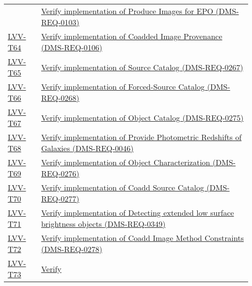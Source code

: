 \begin{longtable}[]{@{}ll@{}}
&
\href{https://jira.lsstcorp.org/secure/Tests.jspa\#/testCase/LVV-T63}{Verify
implementation of Produce Images for EPO (DMS-REQ-0103)}\tabularnewline
\protect\hyperlink{lvv-t64---verify-implementation-of-coadded-image-provenance-dms-req-0106}{LVV-T64}
&
\href{https://jira.lsstcorp.org/secure/Tests.jspa\#/testCase/LVV-T64}{Verify
implementation of Coadded Image Provenance
(DMS-REQ-0106)}\tabularnewline
\protect\hyperlink{lvv-t65---verify-implementation-of-source-catalog-dms-req-0267}{LVV-T65}
&
\href{https://jira.lsstcorp.org/secure/Tests.jspa\#/testCase/LVV-T65}{Verify
implementation of Source Catalog (DMS-REQ-0267)}\tabularnewline
\protect\hyperlink{lvv-t66---verify-implementation-of-forced-source-catalog-dms-req-0268}{LVV-T66}
&
\href{https://jira.lsstcorp.org/secure/Tests.jspa\#/testCase/LVV-T66}{Verify
implementation of Forced-Source Catalog (DMS-REQ-0268)}\tabularnewline
\protect\hyperlink{lvv-t67---verify-implementation-of-object-catalog-dms-req-0275}{LVV-T67}
&
\href{https://jira.lsstcorp.org/secure/Tests.jspa\#/testCase/LVV-T67}{Verify
implementation of Object Catalog (DMS-REQ-0275)}\tabularnewline
\protect\hyperlink{lvv-t68---verify-implementation-of-provide-photometric-redshifts-of-galaxies-dms-req-0046}{LVV-T68}
&
\href{https://jira.lsstcorp.org/secure/Tests.jspa\#/testCase/LVV-T68}{Verify
implementation of Provide Photometric Redshifts of Galaxies
(DMS-REQ-0046)}\tabularnewline
\protect\hyperlink{lvv-t69---verify-implementation-of-object-characterization-dms-req-0276}{LVV-T69}
&
\href{https://jira.lsstcorp.org/secure/Tests.jspa\#/testCase/LVV-T69}{Verify
implementation of Object Characterization (DMS-REQ-0276)}\tabularnewline
\protect\hyperlink{lvv-t70---verify-implementation-of-coadd-source-catalog-dms-req-0277}{LVV-T70}
&
\href{https://jira.lsstcorp.org/secure/Tests.jspa\#/testCase/LVV-T70}{Verify
implementation of Coadd Source Catalog (DMS-REQ-0277)}\tabularnewline
\protect\hyperlink{lvv-t71---verify-implementation-of-detecting-extended--low-surface-brightness-objects-dms-req-0349}{LVV-T71}
&
\href{https://jira.lsstcorp.org/secure/Tests.jspa\#/testCase/LVV-T71}{Verify
implementation of Detecting extended low surface brightness objects
(DMS-REQ-0349)}\tabularnewline
\protect\hyperlink{lvv-t72---verify-implementation-of-coadd-image-method-constraints-dms-req-0278}{LVV-T72}
&
\href{https://jira.lsstcorp.org/secure/Tests.jspa\#/testCase/LVV-T72}{Verify
implementation of Coadd Image Method Constraints
(DMS-REQ-0278)}\tabularnewline
\protect\hyperlink{lvv-t73---verify-implementation-of-deep-detection-coadds-dms-req-0279}{LVV-T73}
&
\href{https://jira.lsstcorp.org/secure/Tests.jspa\#/testCase/LVV-T73}{Verify
}
\end{longtable}
